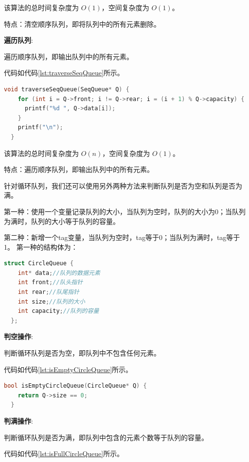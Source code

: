\documentclass[lang=cn,newtx,10pt,scheme=chinese]{elegantbook}
\begin{document}
该算法的总时间复杂度为 $O(1)$，空间复杂度为 $O(1)$。

特点：清空顺序队列，即将队列中的所有元素删除。

\textbf{遍历队列}:

遍历顺序队列，即输出队列中的所有元素。

代码如代码\ref{lst:traverseSeqQueue}所示。

\begin{lstlisting}[language=C++, caption={遍历队列示例代码}, label={lst:traverseSeqQueue}]
  void traverseSeqQueue(SeqQueue* Q) {
    for (int i = Q->front; i != Q->rear; i = (i + 1) % Q->capacity) {
      printf("%d ", Q->data[i]);
    }
    printf("\n");
  }

\end{lstlisting}

该算法的总时间复杂度为 $O(n)$，空间复杂度为 $O(1)$。

特点：遍历顺序队列，即输出队列中的所有元素。

针对循环队列，我们还可以使用另外两种方法来判断队列是否为空和队列是否为满。

第一种：使用一个变量记录队列的大小，当队列为空时，队列的大小为0；当队列为满时，队列的大小等于队列的容量。

第二种：新增一个tag变量，当队列为空时，tag等于0；当队列为满时，tag等于1。
第一种的结构体为：

\begin{lstlisting}[language=C++, caption={循环队列结构体定义}, label={lst:circleQueueStruct}]
  struct CircleQueue {
    int* data;//队列的数据元素
    int front;//队头指针
    int rear;//队尾指针
    int size;//队列的大小
    int capacity;//队列的容量
  };
\end{lstlisting}

\textbf{判空操作}:

判断循环队列是否为空，即队列中不包含任何元素。

代码如代码\ref{lst:isEmptyCircleQueue}所示。

\begin{lstlisting}[language=C++, caption={判断循环队列是否为空示例代码}, label={lst:isEmptyCircleQueue}]
  bool isEmptyCircleQueue(CircleQueue* Q) {
    return Q->size == 0;
  }

\end{lstlisting}

\textbf{判满操作}:

判断循环队列是否为满，即队列中包含的元素个数等于队列的容量。

代码如代码\ref{lst:isFullCircleQueue}所示。
\end{document}
